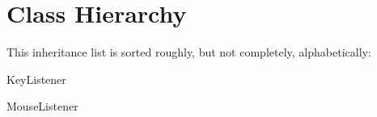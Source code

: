 \section{Class Hierarchy}
This inheritance list is sorted roughly, but not completely, alphabetically\-:\begin{DoxyCompactList}
\item {}
\item Key\-Listener\begin{DoxyCompactList}
\item {}
\end{DoxyCompactList}
\item Mouse\-Listener\begin{DoxyCompactList}
\item {}
\end{DoxyCompactList}
\item {}
\item {}
\item {}
\end{DoxyCompactList}
